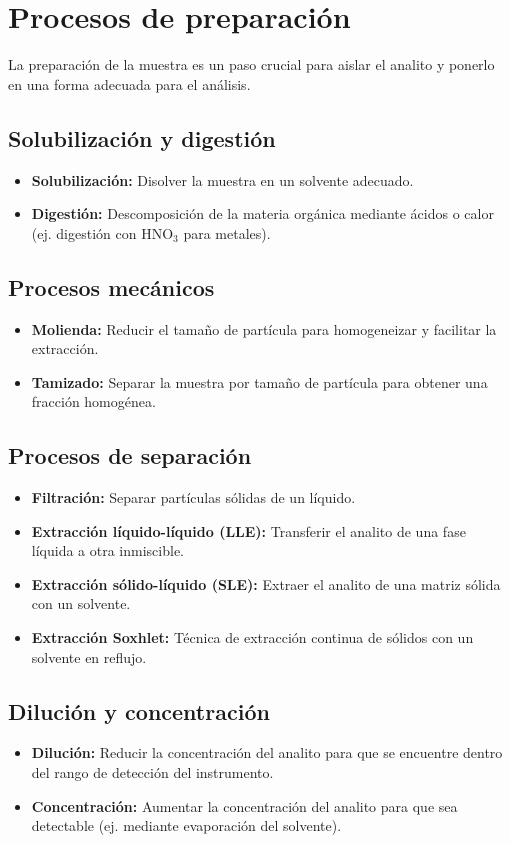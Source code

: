 \section{Procesos de preparación}

La preparación de la muestra es un paso crucial para aislar el analito y ponerlo en una forma adecuada para el análisis.

\subsection{Solubilización y digestión}
\begin{itemize}
    \item \textbf{Solubilización:} Disolver la muestra en un solvente adecuado.
    \item \textbf{Digestión:} Descomposición de la materia orgánica mediante ácidos o calor (ej. digestión con HNO$_3$ para metales).
\end{itemize}

\subsection{Procesos mecánicos}
\begin{itemize}
    \item \textbf{Molienda:} Reducir el tamaño de partícula para homogeneizar y facilitar la extracción.
    \item \textbf{Tamizado:} Separar la muestra por tamaño de partícula para obtener una fracción homogénea.
\end{itemize}

\subsection{Procesos de separación}
\begin{itemize}
    \item \textbf{Filtración:} Separar partículas sólidas de un líquido.
    \item \textbf{Extracción líquido-líquido (LLE):} Transferir el analito de una fase líquida a otra inmiscible.
    \item \textbf{Extracción sólido-líquido (SLE):} Extraer el analito de una matriz sólida con un solvente.
    \item \textbf{Extracción Soxhlet:} Técnica de extracción continua de sólidos con un solvente en reflujo.
\end{itemize}

\subsection{Dilución y concentración}
\begin{itemize}
    \item \textbf{Dilución:} Reducir la concentración del analito para que se encuentre dentro del rango de detección del instrumento.
    \item \textbf{Concentración:} Aumentar la concentración del analito para que sea detectable (ej. mediante evaporación del solvente).
\end{itemize}

